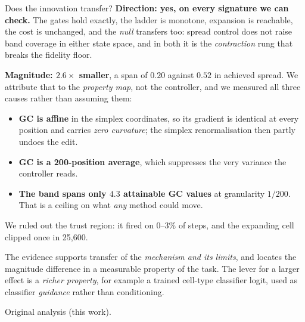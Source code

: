 \documentclass[aspectratio=169,10pt]{beamer}
\newcommand{\theslidelabel}{}
\newcommand{\lbl}[1]{\renewcommand{\theslidelabel}{#1}}
\newcommand{\srcs}[1]{\vfill{\raggedleft\color{grayt}\fontsize{4.9}{5.6}\selectfont #1\par}}
\newcommand{\take}[1]{\vspace{0.4ex}\colorbox{black!6}{\parbox{0.97\linewidth}{\footnotesize #1}}}
\begin{document}
\lbl{3c}
\begin{frame}{Does the innovation transfer?}
  \textbf{Direction: yes, on every signature we can check.} The gates hold exactly,
  the ladder is monotone, expansion is reachable, the cost is unchanged, and the
  \emph{null} transfers too: spread control does not raise band coverage in either
  state space, and in both it is the \emph{contraction} rung that breaks the fidelity
  floor.

  \medskip
  \textbf{Magnitude: $2.6\times$ smaller}, a span of $0.20$ against $0.52$ in
  achieved spread. We attribute that to the \emph{property map}, not the controller,
  and we measured all three causes rather than assuming them:
  \begin{itemize}\setlength\itemsep{0.1em}
    \item \textbf{GC is affine} in the simplex coordinates, so its gradient is
      identical at every position and carries \emph{zero curvature}; the simplex
      renormalisation then partly undoes the edit.
    \item \textbf{GC is a 200-position average}, which suppresses the very variance
      the controller reads.
    \item \textbf{The band spans only $4.3$ attainable GC values} at granularity
      $1/200$. That is a ceiling on what \emph{any} method could move.
  \end{itemize}
  We ruled out the trust region: it fired on 0--3\% of steps, and the expanding cell
  clipped once in 25{,}600.

  \take{The evidence supports transfer of the \emph{mechanism and its limits}, and
  locates the magnitude difference in a measurable property of the task. The lever
  for a larger effect is a \emph{richer property}, for example a trained cell-type
  classifier logit, used as classifier \emph{guidance} rather than conditioning.}

  \srcs{Original analysis (this work).}
\end{frame}
\end{document}
